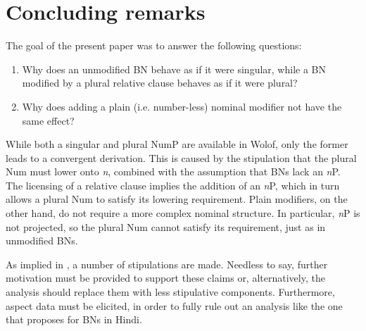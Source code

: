 \documentclass[output=paper]{langscibook}
\begin{document}
	\ea
	    \z
	\z

\section{Concluding remarks}

The goal of the present paper was to answer the following questions:

	
	\begin{enumerate}
	    \item Why does an unmodified BN behave as if it were singular, while a BN modified by a plural relative clause behaves as if it were plural?
        \item Why does adding a plain (i.e. number-less) nominal modifier not have the same effect?
	\end{enumerate}

\noindent   While both a singular and plural NumP are available in Wolof, only the former leads to a convergent derivation. This is caused by the stipulation that the plural Num must lower onto \textit{n}, combined with the assumption that BNs lack an \textit{n}P. The licensing of a relative clause implies the addition of an \textit{n}P, which in turn allows a plural Num to satisfy its lowering requirement. Plain modifiers, on the other hand, do not require a more complex nominal structure. In particular, \textit{n}P is not projected, so the plural Num cannot satisfy its requirement, just as in unmodified BNs.

As implied in , a number of stipulations are made. Needless to say, further motivation must be provided to support these claims or, alternatively, the analysis should replace them with less stipulative components. Furthermore, aspect data must be elicited, in order to fully rule out an analysis like the one that \citet{dayal2011hindi} proposes for BNs in Hindi.
\end{document}
